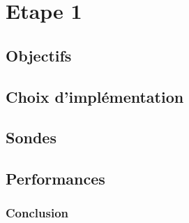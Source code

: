 \section{Etape 1}
\subsection{Objectifs}

\subsection{Choix d'implémentation}

\subsection{Sondes}
\subsection{Performances}

\subsubsection{Conclusion}
    
    

